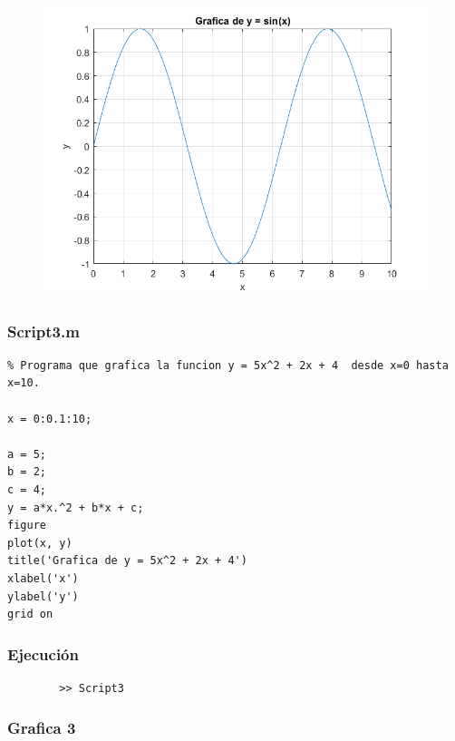 \documentclass{article}
\begin{document}
	\begin{figure}[h]
		\centering
		\includegraphics[width=\textwidth]{grafica2.png}
	\end{figure}
	
	\newpage
	
	\subsubsection{Script3.m}
	
	\begin{lstlisting}
% Programa que grafica la funcion y = 5x^2 + 2x + 4  desde x=0 hasta x=10.

x = 0:0.1:10;

a = 5;
b = 2;
c = 4;
y = a*x.^2 + b*x + c;
figure
plot(x, y)
title('Grafica de y = 5x^2 + 2x + 4')
xlabel('x')
ylabel('y')
grid on
	\end{lstlisting}
	
	\subsubsection{Ejecución}
	
	\begin{lstlisting}
		>> Script3
	\end{lstlisting}
	
	\subsubsection{Grafica 3}
	
\end{document}

